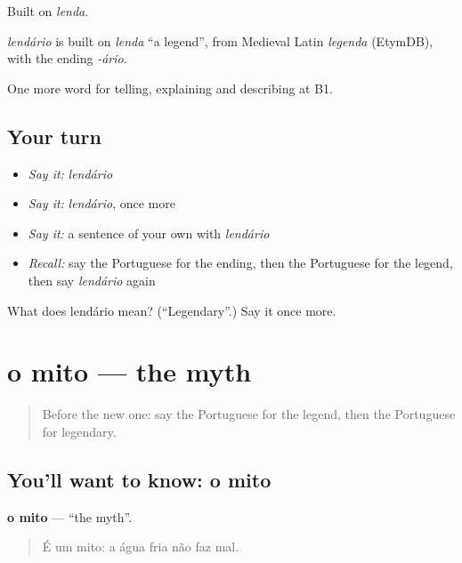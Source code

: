 Built on \emph{lenda}.

\begin{cousinweb}
\emph{lendário} is built on \emph{lenda} \textquotedblleft{}a legend\textquotedblright{}, from Medieval Latin \emph{legenda} (EtymDB), with the ending \emph{-ário}.
\end{cousinweb}

\begin{grammarlens}[title={What you've built}]
One more word for telling, explaining and describing at B1.
\end{grammarlens}

\subsection*{Your turn}
\begin{itemize}
\raggedright
  \item \emph{Say it:} \emph{lendário}
  \item \emph{Say it:} \emph{lendário}, once more
  \item \emph{Say it:} a sentence of your own with \emph{lendário}
  \item \emph{Recall:} say the Portuguese for the ending, then the Portuguese for the legend, then say \emph{lendário} again
\end{itemize}

\begin{tcolorbox}[breakable,colback=teal!4,colframe=teal!35!black,title={Before you move on}]
What does lendário mean? (\textquotedblleft{}Legendary\textquotedblright{}.) Say it once more.
\end{tcolorbox}
\section[o mito]{o mito — the myth}

\label{lesson:PT-C326-mito}



\begin{quote}
Before the new one: say the Portuguese for the legend, then the Portuguese for legendary.
\end{quote}

\subsection*{You'll want to know: o mito}
\textbf{o mito} — \textquotedblleft{}the myth\textquotedblright{}.

\begin{quote}
É um mito: a água fria não faz mal.
\end{quote}


